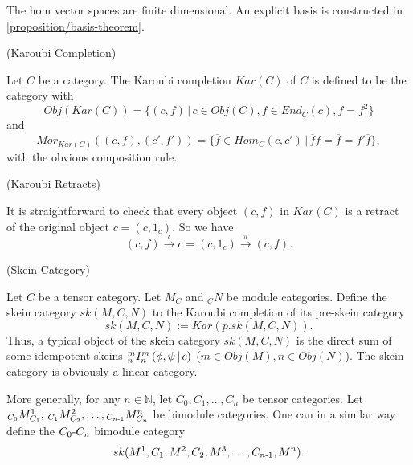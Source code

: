 \noindent The hom vector spaces are finite dimensional. An explicit basis is
constructed in \ref{proposition/basis-theorem}.

\begin{definition} \label{definition/karoubi-completion} (Karoubi Completion)

  \noindent Let $C$ be a category. \quad The Karoubi completion $Kar(C)$ of
  $C$ is defined to be the category with
  \[
    Obj(Kar(C)) = \{(c, f) \,|\, c \in Obj(C), f \in End_{C}(c), f = f^{2}\}
  \] and
  \[
    Mor_{Kar(C)}((c,f), (c', f')) = \{\overline{f} \in Hom_{C}(c,c') \,|\, \overline{f}f = \overline{f} = f'\overline{f}\},
  \]
  with the obvious composition rule.
\end{definition}

\begin{remark} \label{remark/karoubi-retract} (Karoubi Retracts)

  \noindent It is straightforward to check that every object $(c,f)$ in
  $Kar(C)$ is a retract of the original object $c = (c, 1_{c})$. So we have
  \[
    (c, f) \xrightarrow{\iota} c = (c, 1_{c}) \xrightarrow{\pi} (c, f).
  \]
\end{remark}

\begin{definition}\label{definition/skein-category} (Skein Category)

  \noindent Let $C$ be a tensor category. Let $M_{C}$ and $_{C}N$ be module
  categories. \quad Define the skein category $sk(M,C,N)$ to the Karoubi
  completion of its pre-skein category
  \[
    sk(M,C,N) := Kar(p.sk(M,C,N)).
  \]
  \noindent Thus, a typical object of the skein category $sk(M,C,N)$ is the
  direct sum of some idempotent skeins ${}^{m}_{n} I^{m}_{n} \left( \phi, \psi \,\middle|\, c \right)$
  ($m \in Obj(M), n \in Obj(N)$). The skein category is obviously a linear
  category.

  More generally, for any $n \in \mathbb{N}$, let
  $C_{0}, C_{1}, \ldots, C_{n}$ be tensor categories. Let
  ${}_{C_{0}}M^{1}_{C_{1}}, \, {}_{C_{1}}M^{2}_{C_{2}}, \ldots, {}_{C_{n{\text -}1}}M^{n}_{C_{n}}$
  be bimodule categories. One can in a similar way define the
  $C_{0}{\text -}C_{n}$ bimodule category
  \[
    sk(M^{1}, C_{1}, M^{2}, C_{2}, M^{3}, \ldots, C_{n{\text -}1}, M^{n}).
  \]
  \begin{center}
    
  \end{center}

\end{definition}

